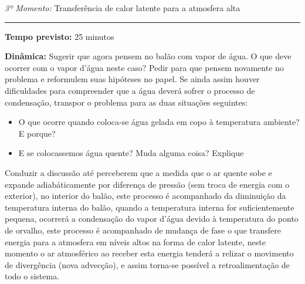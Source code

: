\documentclass[
12pt,				%
openright,			%
oneside,			%
a4paper,			%
chapter=TITLE,		%
english,			%
brazil				%
]{abntex2}
\begin{document}
\newpage
\vspace{50pt}
\noindent\emph{3º Momento:} Transferência de calor latente para a atmosfera alta
\par\noindent\rule{.3\textwidth}{.5pt}
\par\noindent\textbf{Tempo previsto:} 25 minutos
\par\noindent\textbf{Dinâmica:} Sugerir que agora pensem no balão com vapor de água. O que deve ocorrer com o vapor d'água neste caso? Pedir para que pensem novamente no problema e reformulem suas hipóteses no papel. Se ainda assim houver dificuldades para compreender que a água deverá sofrer o processo de condensação, transpor o problema para as duas situações seguintes:
\begin{itemize}
		\item O que ocorre quando coloca-se água gelada em copo à temperatura ambiente? E porque?
		\item E se colocassemos água quente? Muda alguma coisa? Explique
\end{itemize}



Conduzir a discussão até perceberem que a medida que o ar quente sobe e expande adiabáticamente por diferença de pressão (sem troca de energia com o exterior), no interior do balão, este processo é acompanhado da diminuição da temperatura interna do balão, quando a temperatura interna for suficientemente pequena, ocorrerá a condensação do vapor d'água devido à temperatura do ponto de orvalho, este processo é acompanhado de mudança de fase o que transfere energia para a atmosfera em níveis altos na forma de calor latente, neste momento o ar atmosférico ao receber esta energia tenderá a relizar o movimento de divergência (nova advecção), e assim torna-se possível a retroalimentação de todo o sistema. 


\end{document}
